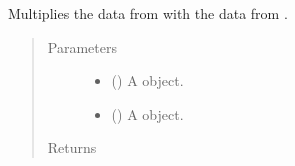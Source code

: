 \documentclass[letterpaper,10pt,openany,oneside,english]{sphinxmanual}
\begin{document}
\begin{fulllineitems}
\label{\detokenize{additional_functions:fredpy.times}}
Multiplies the data from  with the data from .
\begin{quote}\begin{description}
\item[{Parameters}] \leavevmode\begin{itemize}
\item {} 
 ({\hyperref[\detokenize{series_class:fredpy.series}]{}}) \textendash{} A {\hyperref[\detokenize{series_class:fredpy.series}]{}} object.

\item {} 
 ({\hyperref[\detokenize{series_class:fredpy.series}]{}}) \textendash{} A {\hyperref[\detokenize{series_class:fredpy.series}]{}} object.

\end{itemize}

\item[{Returns}] \leavevmode
{\hyperref[\detokenize{series_class:fredpy.series}]{}}

\end{description}\end{quote}

\end{fulllineitems}

\end{document}
